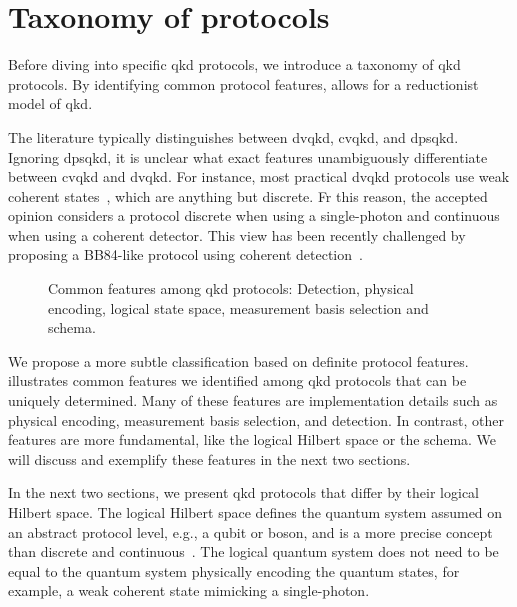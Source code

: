 \section{Taxonomy of protocols}

Before diving into specific \gls{qkd} protocols, we introduce a taxonomy of \gls{qkd} protocols.
By identifying common protocol features, allows for a reductionist model of \gls{qkd}.

The literature typically distinguishes between \gls{dvqkd}, \gls{cvqkd}, and \gls{dpsqkd}.
Ignoring \gls{dpsqkd}, it is unclear what exact features unambiguously differentiate between \gls{cvqkd} and \gls{dvqkd}.
For instance, most practical \gls{dvqkd} protocols use weak coherent states~\cite{Duvsek2006}, which are anything but discrete.
Fr this reason, the accepted opinion considers a protocol discrete when using a single-photon and continuous when using a coherent detector.
This view has been recently challenged by proposing a BB84-like protocol using coherent detection~\cite{Qi2021}.
\begin{figure}[htb]
	\centering
	
	\caption{Common features among \gls{qkd} protocols: Detection, physical encoding, logical state space, measurement basis selection and schema.}\label{fig:qkd_classification}
\end{figure}
We propose a more subtle classification based on definite protocol features.
 illustrates common features we identified among \gls{qkd} protocols that can be uniquely determined.
Many of these features are implementation details such as physical encoding, measurement basis selection, and detection.
In contrast, other features are more fundamental, like the logical Hilbert space or the schema.
We will discuss and exemplify these features in the next two sections.

In the next two sections, we present \gls{qkd} protocols that differ by their logical Hilbert space.
The logical Hilbert space defines the quantum system assumed on an abstract protocol level, e.g., a qubit or boson, and is a more precise concept than discrete and continuous~\cite[p.~2]{Weedbrook2012}.
The logical quantum system does not need to be equal to the quantum system physically encoding the quantum states, for example, a weak coherent state mimicking a single-photon.